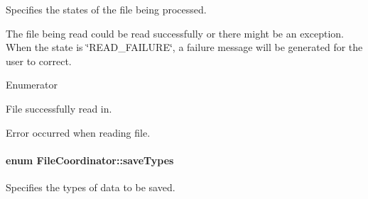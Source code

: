 Specifies the states of the file being processed. 

The file being read could be read successfully or there might be an exception. When the state is \char`\"{}\+R\+E\+A\+D\+\_\+\+F\+A\+I\+L\+U\+R\+E\char`\"{}, a failure message will be generated for the user to correct. \begin{Desc}
\item[Enumerator]\par
\begin{description}
\item[{\em 
\hypertarget{class_file_coordinator_a87882b51519fff558b11f4862a021318af1c825462619cd97356c2609113e828c}{R\+E\+A\+D\+\_\+\+S\+U\+C\+C\+E\+S\+S}\label{class_file_coordinator_a87882b51519fff558b11f4862a021318af1c825462619cd97356c2609113e828c}
}]File successfully read in. \item[{\em 
\hypertarget{class_file_coordinator_a87882b51519fff558b11f4862a021318adad0373980186384b160efe041ed22bd}{R\+E\+A\+D\+\_\+\+F\+A\+I\+L\+U\+R\+E}\label{class_file_coordinator_a87882b51519fff558b11f4862a021318adad0373980186384b160efe041ed22bd}
}]Error occurred when reading file. \end{description}
\end{Desc}
\hypertarget{class_file_coordinator_a3675d464de774750ec143958d199891e}{
\paragraph[{save\+Types}]{\setlength{\rightskip}{0pt plus 5cm}enum {\bf File\+Coordinator\+::save\+Types}}}\label{class_file_coordinator_a3675d464de774750ec143958d199891e}


Specifies the types of data to be saved. 

